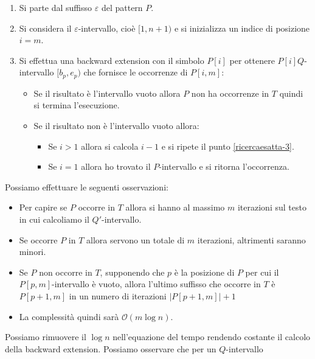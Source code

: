 \begin{enumerate}
    \item Si parte dal suffisso $\varepsilon$ del pattern $P$.
    \item Si considera il $\varepsilon$-intervallo, cioè $[1, n + 1)$ e si
          inizializza un indice di posizione $i = m$.
    \item \label{ricercaesatta-3} Si effettua una backward extension con il
          simbolo $P[i]$ per ottenere $P[i]Q$-intervallo $[b_p, e_p)$ che
          fornisce le occorrenze di $P[i,m]$:
          \begin{itemize}
              \item Se il risultato è l'intervallo vuoto allora $P$ non ha
                    occorrenze in $T$ quindi si termina l'esecuzione.
              \item Se il risultato non è l'intervallo vuoto allora:
                    \begin{itemize}
                        \item Se $i > 1$ allora si calcola $i - 1$ e si ripete
                              il punto \ref{ricercaesatta-3}.
                        \item Se $i = 1$ allora ho trovato il $P$-intervallo e
                              si ritorna l'occorrenza.
                    \end{itemize}
          \end{itemize}
\end{enumerate}
Possiamo effettuare le seguenti osservazioni:
\begin{itemize}
    \item Per capire se $P$ occorre in $T$ allora si hanno al massimo $m$
          iterazioni sul testo in cui calcoliamo il $Q'$-intervallo.
    \item Se occorre $P$ in $T$ allora servono un totale di $m$ iterazioni,
          altrimenti saranno minori.
    \item Se $P$ non occorre in $T$, supponendo che $p$ è la posizione di $P$
          per cui il $P[p, m]$-intervallo è vuoto, allora l'ultimo suffisso che
          occorre in $T$ è $P[p + 1, m]$ in un numero di iterazioni $|P[p + 1,
              m]| + 1$
    \item La complessità quindi sarà $\mathcal{O}(m \log n)$.
\end{itemize}
Possiamo rimuovere il $\log n$ nell'equazione del tempo rendendo costante
il calcolo della backward extension. Possiamo osservare che per un $Q$-intervallo
